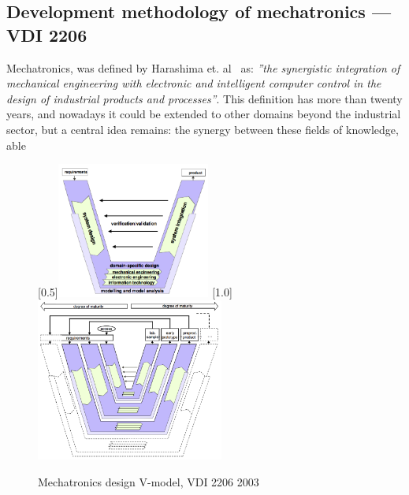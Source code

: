 \subsection{Development methodology of mechatronics --- VDI 2206}
\label{subsec:vdi-2206}

Mechatronics, was defined by Harashima et. al~\cite{harashima1996mechatronics}
as: \emph{''the synergistic integration of mechanical engineering
with electronic and intelligent computer control in the design of industrial
products and processes''}. This definition has more than twenty years, and
nowadays it could be extended to other domains beyond the industrial sector,
but a central idea remains: the synergy between these fields of knowledge, able
\begin{figure}[!hbt]
    \centering
    [0.5\linewidth]{\includegraphics[width=0.45\textwidth]{./img/v-model-macro.png}}
    [1.0\linewidth]{\includegraphics[width=0.55\textwidth]{./img/v-model-iter.png}}
    \caption{Mechatronics design V-model, VDI 2206 2003~\cite{gausemeier2003new}}
\label{fig:v-model}
\end{figure}

